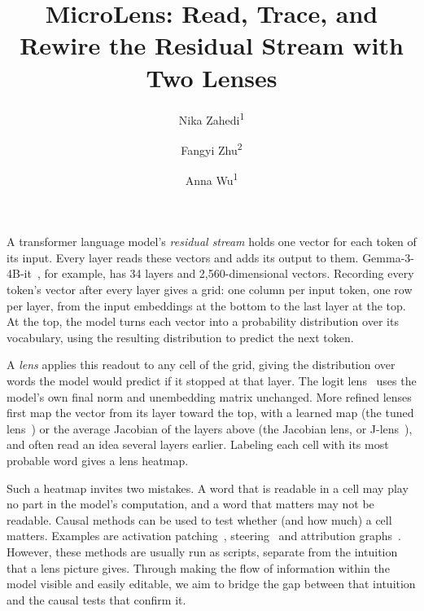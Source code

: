 \documentclass{vgtc}       %
\title{MicroLens: Read, Trace, and Rewire the Residual Stream with Two Lenses}
\author{Nika Zahedi\textsuperscript{1} \and Fangyi Zhu\textsuperscript{2} \and Anna Wu\textsuperscript{1}}
\affiliation{\scriptsize \textsuperscript{1}Stanford University \quad \textsuperscript{2}Independent researcher}
\newcommand{\LL}{logit lens}
\newcommand{\JL}{J-lens}
\begin{document}
\maketitle

A transformer language model's \emph{residual stream} holds one vector for each token of its input. Every layer
reads these vectors and adds its output to them. Gemma-3-4B-it~\cite{gemma3}, for example, has 34 layers and
2,560-dimensional vectors. Recording every token's vector after every layer gives a grid: one column per input
token, one row per layer, from the input embeddings at the bottom to the last layer at the top. At the top, the model
turns each vector into a probability distribution over its vocabulary, using the resulting distribution to predict the next token.

A \emph{lens} applies this readout to any cell of the grid, giving the distribution over words the model would
predict if it stopped at that layer. The \LL~\cite{nostalgebraist2020} uses the model's own final norm and
unembedding matrix unchanged. More refined lenses first map the vector from its layer toward the top, with a learned
map (the tuned lens~\cite{belrose2023tuned}) or the average Jacobian of the layers above (the Jacobian lens, or
\JL~\cite{workspace2026}), and often read an idea several layers earlier. Labeling each cell with its most probable
word gives a lens heatmap.

Such a heatmap invites two mistakes. A word that is readable in a cell may play no part in the model's computation,
and a word that matters may not be readable. Causal methods can be used to test whether (and how much) a cell matters. Examples are activation
patching~\cite{meng2022rome, zhang2024patching}, steering~\cite{turner2023actadd} and attribution
graphs~\cite{ameisen2025circuit, lindsey2025biology}. However, these methods are usually run as scripts, separate from
the intuition that a lens picture gives. Through making the flow of information within the model visible and easily
editable, we aim to bridge the gap between that intuition and the causal tests that confirm it.
\end{document}
